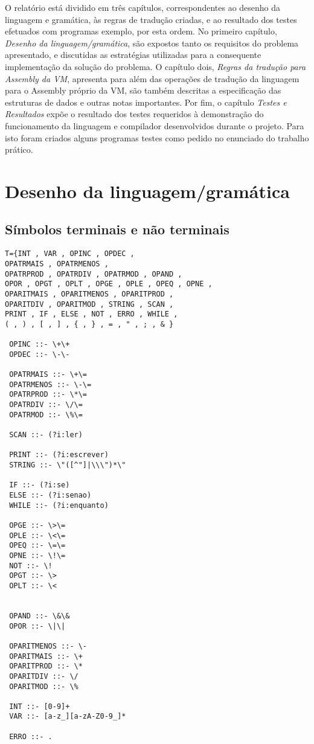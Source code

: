 \documentclass{report}
\begin{document}
O relatório está dividido em três capítulos, correspondentes ao desenho da linguagem e gramática, às regras de tradução criadas,
e ao resultado dos testes efetuados com programas exemplo, por esta ordem. 
No primeiro capítulo, \emph{Desenho da linguagem/gramática}, são expostos tanto os requisitos do problema  apresentado, e discutidas as estratégias utilizadas para a consequente implementação da solução do problema. O capítulo dois, \emph{Regras da tradução para Assembly da VM}, apresenta para além das operações de tradução da linguagem para o Assembly próprio da VM, são também descritas a especificação das estruturas de dados e outras notas importantes.
Por fim, o capítulo \emph{Testes e Resultados} expõe o resultado dos testes requeridos à demonstração do funcionamento da linguagem e compilador desenvolvidos durante o projeto. Para isto foram criados alguns programas testes como pedido no enunciado do trabalho prático.

\chapter{Desenho da linguagem/gramática} \label{ae}

\section{Símbolos terminais e não terminais}

\begin{verbatim}
T={INT , VAR , OPINC , OPDEC , 
OPATRMAIS , OPATRMENOS , 
OPATRPROD , OPATRDIV , OPATRMOD , OPAND , 
OPOR , OPGT , OPLT , OPGE , OPLE , OPEQ , OPNE ,
OPARITMAIS , OPARITMENOS , OPARITPROD ,
OPARITDIV , OPARITMOD , STRING , SCAN , 
PRINT , IF , ELSE , NOT , ERRO , WHILE , 
( , ) , [ , ] , { , } , = , " , ; , & }
 
 OPINC ::- \+\+    
 OPDEC ::- \-\-    
 
 OPATRMAIS ::- \+\=    
 OPATRMENOS ::- \-\=    
 OPATRPROD ::- \*\=     
 OPATRDIV ::- \/\=     
 OPATRMOD ::- \%\=    
 
 SCAN ::- (?i:ler)
 
 PRINT ::- (?i:escrever)
 STRING ::- \"([^"]|\\\")*\"
 
 IF ::- (?i:se)   
 ELSE ::- (?i:senao)
 WHILE ::- (?i:enquanto)
 
 OPGE ::- \>\=
 OPLE ::- \<\=
 OPEQ ::- \=\=
 OPNE ::- \!\=
 NOT ::- \!    
 OPGT ::- \>    
 OPLT ::- \<    
 
 
 OPAND ::- \&\&
 OPOR ::- \|\|
 
 OPARITMENOS ::- \-    
 OPARITMAIS ::- \+    
 OPARITPROD ::- \*    
 OPARITDIV ::- \/    
 OPARITMOD ::- \%    
 
 INT ::- [0-9]+
 VAR ::- [a-z_][a-zA-Z0-9_]*     
 
 ERRO ::- .
\end{verbatim}
 
\end{document}
